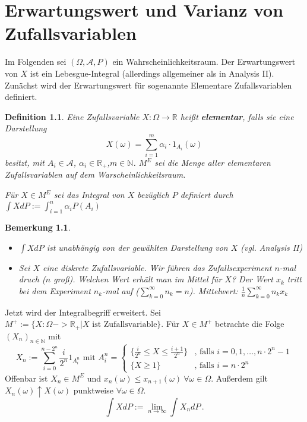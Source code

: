 \documentclass[a4paper,11pt]{book}
\newcommand{\R}{{\mathbb R}}
\newcommand{\N}{{\mathbb N}}
\def\AA{ \mathcal{A} }
\newtheorem{Def}{Definition}[chapter]
\newtheorem{Bem}{Bemerkung}[chapter]
\theoremstyle{nonumberplain}
\begin{document}
\chapter[Erwartungswert und Varianz]{Erwartungswert und Varianz von Zufallsvariablen}
Im Folgenden sei $(\Omega,\AA,P)$ ein Wahrscheinlichkeitsraum. Der Erwartungswert von $X$ ist ein Lebesgue-Integral (allerdings allgemeiner als in Analysis II). Zunächst wird der Erwartungswert für sogenannte Elementare Zufallsvariablen definiert.

\begin{Def}
Eine Zufallsvariable $X:\Omega\to\R$ heißt \textbf{elementar}, falls sie eine Darstellung
\[ X(\omega) = \sum_{i=1}^m \alpha_i \cdot 1_{A_i}(\omega) \]
besitzt, mit $A_i \in \AA$, $\alpha_i\in\R_+$,$m\in\N$. $M^E$ sei die Menge aller elementaren Zufallsvariablen auf dem Warscheinlichkeitsraum.

Für $X\in M^E$ sei das Integral von $X$ bezüglich $P$ definiert durch $\int X d P := \int_{i=1}^n \alpha_i P(A_i)$
\end{Def}

\begin{Bem}
\begin{itemize}
\item[a)] $\int X d P$ ist unabhängig von der gewählten Darstellung von $X$ (vgl. Analysis II)
\item[b)] Sei $X$ eine diskrete Zufallsvariable. Wir führen das Zufallsexperiment $n$-mal druch ($n$ groß). Welchen Wert erhält man im Mittel für $X$? Der Wert $x_k$ tritt bei dem Experiment $n_k$-mal auf ($\sum_{k=0}^\infty n_k = n$). Mittelwert: $\frac1n\sum_{k=0}^\infty n_k x_k$
\end{itemize}
\end{Bem}

Jetzt wird der Integralbegriff erweitert. Sei $M^+ := \{X:\Omega->\R_+| X\text{ ist Zufallsvariable}\}$. Für $X\in M^+$ betrachte die Folge $ (X_n)_{n\in\N} $ mit 
\[X_n:= \sum_{i=0}^{n-2^n} \frac i {2^n} 1_{A_i^n}\text{ mit }A_i^n = \begin{cases} \{\frac{i}{2^n} \le X \le \frac{i+1}{2^n}\} &\text{, falls } i=0,1,\ldots,n\cdot 2^n-1 \\ \{X\ge 1\} & \text{, falls } i = n\cdot 2^n \end{cases} \]
Offenbar ist $X_n\in M^E$ und $x_n(\omega) \le x_{n+1}(\omega) \ \forall \omega \in\Omega$. Außerdem gilt $X_n(\omega)\uparrow X(\omega)$ punktweise $\forall \omega\in\Omega$.
\[ \int X d P := \lim_{n\to\infty} \int X_n d P\,.\]
\end{document}
